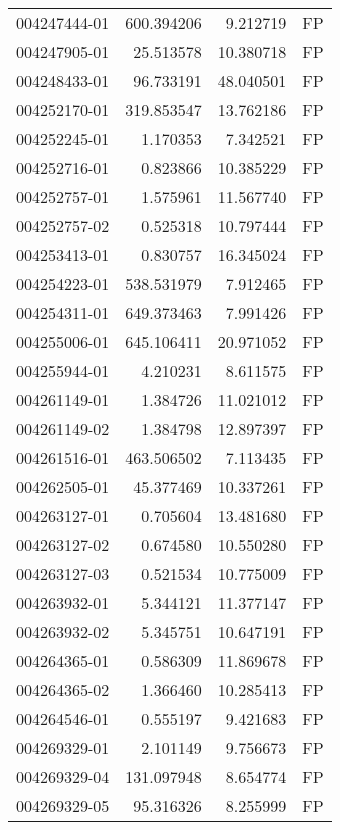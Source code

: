 \begin{tabular}{lrrl}
004247444-01 &  600.394206 &       9.212719 &   FP \\
004247905-01 &   25.513578 &      10.380718 &   FP \\
004248433-01 &   96.733191 &      48.040501 &   FP \\
004252170-01 &  319.853547 &      13.762186 &   FP \\
004252245-01 &    1.170353 &       7.342521 &   FP \\
004252716-01 &    0.823866 &      10.385229 &   FP \\
004252757-01 &    1.575961 &      11.567740 &   FP \\
004252757-02 &    0.525318 &      10.797444 &   FP \\
004253413-01 &    0.830757 &      16.345024 &   FP \\
004254223-01 &  538.531979 &       7.912465 &   FP \\
004254311-01 &  649.373463 &       7.991426 &   FP \\
004255006-01 &  645.106411 &      20.971052 &   FP \\
004255944-01 &    4.210231 &       8.611575 &   FP \\
004261149-01 &    1.384726 &      11.021012 &   FP \\
004261149-02 &    1.384798 &      12.897397 &   FP \\
004261516-01 &  463.506502 &       7.113435 &   FP \\
004262505-01 &   45.377469 &      10.337261 &   FP \\
004263127-01 &    0.705604 &      13.481680 &   FP \\
004263127-02 &    0.674580 &      10.550280 &   FP \\
004263127-03 &    0.521534 &      10.775009 &   FP \\
004263932-01 &    5.344121 &      11.377147 &   FP \\
004263932-02 &    5.345751 &      10.647191 &   FP \\
004264365-01 &    0.586309 &      11.869678 &   FP \\
004264365-02 &    1.366460 &      10.285413 &   FP \\
004264546-01 &    0.555197 &       9.421683 &   FP \\
004269329-01 &    2.101149 &       9.756673 &   FP \\
004269329-04 &  131.097948 &       8.654774 &   FP \\
004269329-05 &   95.316326 &       8.255999 &   FP \\

\end{tabular}
